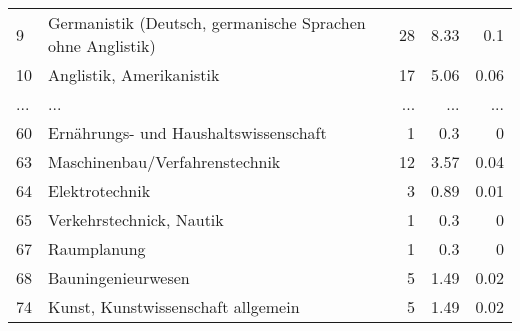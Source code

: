 \begin{longtable}{lXrrr}
        9 & \multicolumn{1}{X}{Germanistik (Deutsch, germanische Sprachen ohne Anglistik)} & %
          \num{28} &
          \num[round-mode=places,round-precision=2]{8.33} &
          \num[round-mode=places,round-precision=2]{0.1} \\
        10 & \multicolumn{1}{X}{Anglistik, Amerikanistik} & %
          \num{17} &
          \num[round-mode=places,round-precision=2]{5.06} &
          \num[round-mode=places,round-precision=2]{0.06} \\
       ... & ... & ... & ... & ... \\
        60 & \multicolumn{1}{X}{Ernährungs- und Haushaltswissenschaft} & %
          \num{1} &
          \num[round-mode=places,round-precision=2]{0.3} &
          \num[round-mode=places,round-precision=2]{0} \\

        63 & \multicolumn{1}{X}{Maschinenbau/Verfahrenstechnik} & %
          \num{12} &
          \num[round-mode=places,round-precision=2]{3.57} &
          \num[round-mode=places,round-precision=2]{0.04} \\

        64 & \multicolumn{1}{X}{Elektrotechnik} & %
          \num{3} &
          \num[round-mode=places,round-precision=2]{0.89} &
          \num[round-mode=places,round-precision=2]{0.01} \\

        65 & \multicolumn{1}{X}{Verkehrstechnick, Nautik} & %
          \num{1} &
          \num[round-mode=places,round-precision=2]{0.3} &
          \num[round-mode=places,round-precision=2]{0} \\

        67 & \multicolumn{1}{X}{Raumplanung} & %
          \num{1} &
          \num[round-mode=places,round-precision=2]{0.3} &
          \num[round-mode=places,round-precision=2]{0} \\

        68 & \multicolumn{1}{X}{Bauningenieurwesen} & %
          \num{5} &
          \num[round-mode=places,round-precision=2]{1.49} &
          \num[round-mode=places,round-precision=2]{0.02} \\

        74 & \multicolumn{1}{X}{Kunst, Kunstwissenschaft allgemein} & %
          \num{5} &
          \num[round-mode=places,round-precision=2]{1.49} &
          \num[round-mode=places,round-precision=2]{0.02} \\


\end{longtable}
